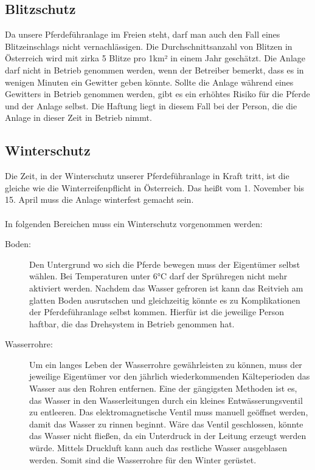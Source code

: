 \documentclass[12pt]{scrreprt} %
\begin{document}
\subsection{Blitzschutz}
\label{sec:blitzschutz}

Da unsere Pferdeführanlage im Freien steht, darf man auch den Fall eines Blitzeinschlags nicht vernachlässigen. 
Die Durchschnittsanzahl von Blitzen in Österreich wird mit zirka 5 Blitze pro 1km² in einem Jahr geschätzt. 
Die Anlage darf nicht in Betrieb genommen werden, wenn der Betreiber bemerkt, 
dass es in wenigen Minuten ein Gewitter geben könnte.
Sollte die Anlage während eines Gewitters in Betrieb genommen werden, 
gibt es ein erhöhtes Risiko für die Pferde und der Anlage selbst.
Die Haftung liegt in diesem Fall bei der Person, die die Anlage in dieser Zeit in Betrieb nimmt.

\subsection{Winterschutz}
\label{sec:winterschutz}

Die Zeit, in der Winterschutz unserer Pferdeführanlage in Kraft tritt, ist die gleiche wie die Winterreifenpflicht in Österreich. Das heißt vom 1. November bis 15. April muss die Anlage winterfest gemacht sein. 
\\
\\
In folgenden Bereichen muss ein Winterschutz vorgenommen werden:
\begin{description}
\item[Boden:]
Den Untergrund wo sich die Pferde bewegen muss der Eigentümer selbst wählen. Bei Temperaturen unter 6°C darf der Sprühregen nicht mehr aktiviert werden. Nachdem das Wasser gefroren ist kann das Reitvieh am glatten Boden ausrutschen und gleichzeitig könnte es zu Komplikationen der Pferdeführanlage selbst kommen. Hierfür ist die jeweilige Person haftbar, die das Drehsystem in Betrieb genommen hat.

\item[Wasserrohre:]

Um ein langes Leben der Wasserrohre gewährleisten zu können, muss der jeweilige Eigentümer vor den jährlich wiederkommenden Kälteperioden das Wasser aus den Rohren entfernen. Eine der gängigsten Methoden ist es, das Wasser in den Wasserleitungen durch ein kleines Entwässerungsventil zu entleeren. Das elektromagnetische Ventil muss manuell geöffnet werden, damit das Wasser zu rinnen beginnt. Wäre das Ventil geschlossen, könnte das Wasser nicht fließen, da ein Unterdruck in der Leitung erzeugt werden würde. Mittels Druckluft kann auch das restliche Wasser ausgeblasen werden. Somit sind die Wasserrohre für den Winter gerüstet.

\end{description}
\end{document}
